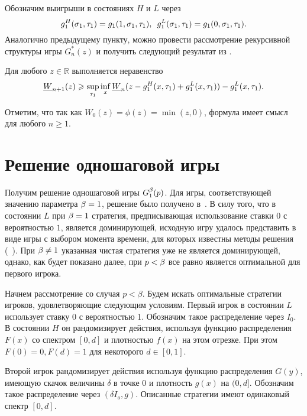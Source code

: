 {Обозначим выигрыши в состояниях $H$ и $L$ через
\begin{equation*}
 g^H_1(\sigma_1, \tau_1) = g_1(1, \sigma_1, \tau_1), \enskip g^L_1(\sigma_1, \tau_1) = g_1(0, \sigma_1, \tau_1).
\end{equation*}
Аналогично предыдущему пункту, можно провести рассмотрение рекурсивной структуры игры $G^*_n(z)$ и получить следующий результат из \cite{demeyer02}.
\begin{lemma}\label{ch3:lem:low-bound-dual:general}
  Для любого $z \in \mathbb{R}$ выполняется неравенство
  \begin{equation}\label{ch3:eq:low-bound-dual:general}
    \LW{n+1}(z) \geqslant \sup_{\tau_1} \inf_x
    \LW{n}(z - g^H_1(x, \tau_1) + g_1^L(x, \tau_1)) - g^L_1(x, \tau_1).
  \end{equation}
\end{lemma}
Отметим, что так как $W_0(z) = \phi(z) = \min(z, 0)$, формула имеет смысл для любого $n \geqslant 1$.

\section{Решение одношаговой игры}
\label{ch3:sec:1st}

Получим решение одношаговой игры $G^{\beta}_1(p)$.
Для игры, соответствующей значению параметра $\beta = 1$, решение было получено в~\cite{sandomirskaya12}.
В силу того, что в состоянии $L$ при $\beta = 1$ стратегия, предписывающая использование ставки $0$ с вероятностью $1$, является доминирующей, исходную игру удалось представить в виде игры с выбором момента времени, для которых известны методы решения (\seename~\cite{karlin64}).
При $\beta \neq 1$ указанная чистая стратегия уже не является доминирующей, однако, как будет показано далее, при $p < \beta$ все равно является оптимальной для первого игрока.

Начнем рассмотрение со случая $p < \beta$.
Будем искать оптимальные стратегии игроков, удовлетворяющие следующим условиям.
Первый игрок в состоянии $L$ использует ставку $0$ с вероятностью 1.
Обозначим такое распределение через $I_0$.
В состоянии $H$ он рандомизирует действия, используя функцию распределения $F(x)$ со спектром $[0, d]$ и плотностью $f(x)$ на этом отрезке. При этом $F(0) = 0, F(d) = 1$ для некоторого $d \in [0, 1]$.

Второй игрок рандомизирует действия используя функцию распределения $G(y)$, имеющую скачок величины $\delta$ в точке $0$ и плотность $g(x)$ на $(0, d]$.
Обозначим такое распределение через $(\delta I_o, g)$.
Описанные стратегии имеют одинаковый спектр $[0, d]$.

}
